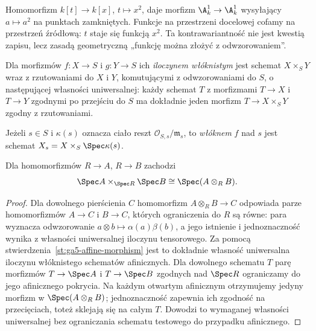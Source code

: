 \begin{przyklad}
Homomorfizm $k[t]\to k[x]$, $t\mapsto x^2$, daje morfizm
$\A^1_k\to\A^1_k$ wysyłający $a\mapsto a^2$ na punktach
zamkniętych. Funkcje na przestrzeni docelowej cofamy na przestrzeń
źródłową: $t$ staje się funkcją $x^2$.
Ta kontrawariantność nie jest kwestią zapisu, lecz zasadą
geometryczną „funkcję można złożyć z odwzorowaniem”.
\end{przyklad}

\begin{definicja}
\label{def:ga5-fibreproduct}
Dla morfizmów $f:X\to S$ i $g:Y\to S$ ich \emph{iloczynem
włóknistym} jest schemat $X\times_S Y$ wraz z rzutowaniami do $X$
i $Y$, komutującymi z odwzorowaniami do $S$, o następującej
własności uniwersalnej: każdy schemat $T$ z morfizmami $T\to X$
i $T\to Y$ zgodnymi po przejściu do $S$ ma dokładnie jeden
morfizm $T\to X\times_S Y$ zgodny z rzutowaniami.

Jeżeli $s\in S$ i $\kappa(s)$ oznacza ciało reszt
$\mathcal O_{S,s}/\mathfrak m_s$, to \emph{włóknem} $f$ nad $s$
jest schemat $X_s=X\times_S\Spec\kappa(s)$.
\end{definicja}

\begin{stwierdzenie}
\label{st:ga5-tensor-fibre}
Dla homomorfizmów $R\to A$, $R\to B$ zachodzi
\[
 \Spec A\times_{\Spec R}\Spec B\cong\Spec(A\otimes_R B).
\]
\end{stwierdzenie}
\begin{proof}
Dla dowolnego pierścienia $C$ homomorfizm
$A\otimes_R B\to C$ odpowiada parze homomorfizmów
$A\to C$ i $B\to C$, których ograniczenia do $R$ są równe:
para wyznacza odwzorowanie $a\otimes b\mapsto\alpha(a)\beta(b)$,
a jego istnienie i jednoznaczność wynika z własności uniwersalnej
iloczynu tensorowego. Za pomocą stwierdzenia~\ref{st:ga5-affine-morphism}
jest to dokładnie własność uniwersalna iloczynu włóknistego
schematów afinicznych. Dla dowolnego schematu $T$ parę
morfizmów $T\to\Spec A$ i $T\to\Spec B$ zgodnych nad
$\Spec R$ ograniczamy do jego afinicznego pokrycia.
Na każdym otwartym afinicznym otrzymujemy jedyny morfizm
w $\Spec(A\otimes_R B)$; jednoznaczność zapewnia ich
zgodność na przecięciach, toteż sklejają się na całym $T$.
Dowodzi to wymaganej własności uniwersalnej bez
ograniczania schematu testowego do przypadku afinicznego.
\end{proof}

